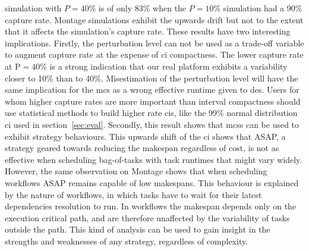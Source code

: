 \documentclass[]{llncs}
\begin{document}
simulation with $P=40\%$ is of only 83\% when the $P=10\%$ simulation had a 90\% 
capture rate. Montage simulations exhibit the upwards drift but not to the
extent that it affects the simulation's capture rate. These results have two 
interesting implications.
%
%
Firstly, the perturbation level can
not be used as a trade-off variable to augment capture rate at the expense of
\ac{ci} compactness. The lower capture rate at P$=40\%$ is a
strong indication that our real platform exhibits a variability closer to
10\% than to 40\%. Misestimation of the perturbation level will have the same
implication for the \ac{mcs} as a wrong effective runtime given to \ac{des}. 
Users for whom higher capture rates are more important than
interval compactness should use statistical methods to build higher rate \acp{ci},
like the 99\% normal distribution \ac{ci} used in section~\ref{sec:eval}.
%
Secondly, this result shows that \ac{mcs}s can be used to exhibit strategy
behaviours. This upwards shift of the \ac{ci} shows that ASAP, a strategy
geared towards reducing the makespan regardless of cost, is not as effective
when scheduling bag-of-tasks with task runtimes that might vary widely. However,
the same observation on Montage shows that when scheduling workflows ASAP 
remains capable of low makespans. This behaviour is explained by the nature of 
workflows, in which tasks have to wait for their latest dependencies resolution 
to run. In workflows the makespan depends only on the execution critical path, 
and are therefore unaffected by the variability of tasks outside the path. 
This kind of analysis can be used to gain insight in the strengths and 
weaknesses of any strategy, regardless of complexity.
\end{document}
